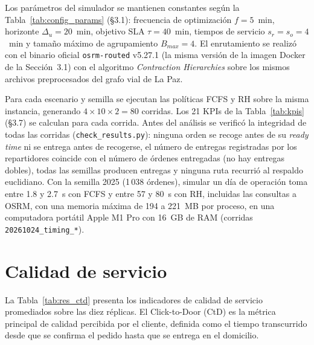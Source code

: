 \documentclass[12pt,letterpaper,oneside]{book}
\begin{document}
	Los parámetros del simulador se mantienen constantes según la Tabla~\ref{tab:config_params}
	(§3.1): frecuencia de optimización $f = 5$~min, horizonte $\Delta_u = 20$~min,
	objetivo SLA $\tau = 40$~min, tiempos de servicio $s_r = s_o = 4$~min y tamaño máximo de
	agrupamiento $B_{max} = 4$.  El enrutamiento se realizó con el binario oficial
	\texttt{osrm-routed} v5.27.1 (la misma versión de la imagen Docker de la Sección~3.1)
	con el algoritmo \textit{Contraction Hierarchies} sobre los mismos archivos preprocesados
	del grafo vial de La Paz.

	Para cada escenario y semilla se ejecutan las políticas FCFS y RH sobre la misma instancia,
	generando $4 \times 10 \times 2 = 80$ corridas.  Los 21 KPIs de la Tabla~\ref{tab:kpis}
	(§3.7) se calculan para cada corrida.  Antes del análisis se verificó la integridad de
	todas las corridas (\texttt{check\_results.py}): ninguna orden se recoge antes de su
	\textit{ready time} ni se entrega antes de recogerse, el número de entregas registradas por
	los repartidores coincide con el número de órdenes entregadas (no hay entregas dobles),
	todas las semillas producen entregas y ninguna ruta recurrió al respaldo euclidiano.
	Con la semilla 2025 (1\,038 órdenes), simular un día de operación toma entre 1.8 y 2.7~s con
	FCFS y entre 57 y 80~s con RH, incluidas las consultas a OSRM, con una memoria máxima de 194 a
	221~MB por proceso, en una computadora portátil Apple M1 Pro con 16~GB de RAM (corridas
	\texttt{20261024\_timing\_*}).

	\section{Calidad de servicio}

	La Tabla~\ref{tab:res_ctd} presenta los indicadores de calidad de servicio promediados
	sobre las diez réplicas.  El Click-to-Door (CtD) es la métrica principal de calidad
	percibida por el cliente, definida como el tiempo transcurrido desde que se confirma
	el pedido hasta que se entrega en el domicilio.
\end{document}
